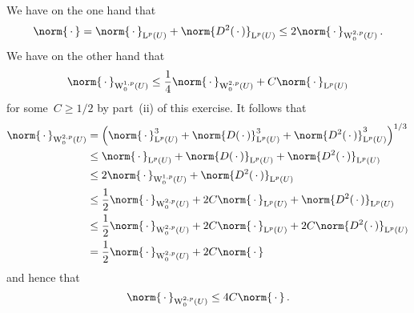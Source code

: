 \subsection{}

We have on the one hand that
\[
  \norm{\,\cdot\,}
  =
  \norm{\,\cdot\,}_{\Lp^p(U)}
  +
  \norm{D^2(\,\cdot\,)}_{\Lp^p(U)}
  \leq
  2 \norm{\,\cdot\,}_{\Wp^{2,p}_0(U)} \,.
\]
We have on the other hand that
\[
  \norm{\,\cdot\,}_{\Wp^{1,p}_0(U)}
  \leq
  \frac{1}{4} \norm{\,\cdot\,}_{\Wp^{2,p}_0(U)}
  +
  C \norm{\,\cdot\,}_{\Lp^p(U)}
\]
for some~$C \geq 1/2$ by part~(ii) of this exercise.
It follows that
\begin{align*}
  \norm{\,\cdot\,}_{\Wp^{2,p}_0(U)}
  &=
  \left(
    \norm{\,\cdot\,}_{\Lp^p(U)}^3
    +
    \norm{D(\,\cdot\,)}_{\Lp^p(U)}^3
    +
    \norm{D^2(\,\cdot\,)}_{\Lp^p(U)}^3
  \right)^{1/3}
  \\
  &\leq
  \norm{\,\cdot\,}_{\Lp^p(U)}
  +
  \norm{D(\,\cdot\,)}_{\Lp^p(U)}
  +
  \norm{D^2(\,\cdot\,)}_{\Lp^p(U)}
  \\
  &\leq
  2 \norm{\,\cdot\,}_{\Wp^{1,p}_0(U)}
  +
  \norm{D^2(\,\cdot\,)}_{\Lp^p(U)}
  \\
  &\leq
  \frac{1}{2} \norm{\,\cdot\,}_{\Wp^{2,p}_0(U)}
  +
  2C \norm{\,\cdot\,}_{\Lp^p(U)}
  +
  \norm{D^2(\,\cdot\,)}_{\Lp^p(U)}
  \\
  &\leq
  \frac{1}{2} \norm{\,\cdot\,}_{\Wp^{2,p}_0(U)}
  +
  2C \norm{\,\cdot\,}_{\Lp^p(U)}
  +
  2C \norm{D^2(\,\cdot\,)}_{\Lp^p(U)}
  \\
  &=
  \frac{1}{2} \norm{\,\cdot\,}_{\Wp^{2,p}_0(U)}
  +
  2C \norm{\,\cdot\,}
\end{align*}
and hence that
\[
  \norm{\,\cdot\,}_{\Wp^{2,p}_0(U)}
  \leq
  4 C \norm{\,\cdot\,} \,.
\]




